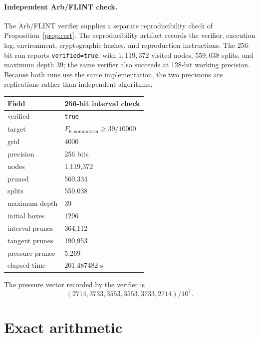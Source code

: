 \documentclass[11pt]{article}
\begin{document}
\paragraph{Independent Arb/FLINT check.}
The Arb/FLINT verifier supplies a separate reproducibility check of
Proposition~\ref{prop:cert}.  The reproducibility artifact
\cite{Hurtado26Artifact} records the verifier, execution log, environment,
cryptographic hashes, and reproduction instructions.  The 256-bit run reports
\texttt{verified=true}, with $1{,}119{,}372$ visited nodes, $559{,}038$
splits, and maximum depth $39$; the same verifier also succeeds at 128-bit
working precision.  Because both runs use the same implementation, the two
precisions are replications rather than independent algorithms.

\begin{center}
\begin{tabular}{@{}ll@{}}
\toprule
Field & 256-bit interval check\\
\midrule
verified & \texttt{true}\\
target & $F_{6,\mathrm{nonuniform}}\ge39/10000$\\
grid & 4000\\
precision & 256 bits\\
nodes & 1,119,372\\
pruned & 560,334\\
splits & 559,038\\
maximum depth & 39\\
initial boxes & 1296\\
interval prunes & 364,112\\
tangent prunes & 190,953\\
pressure prunes & 5,269\\
elapsed time & 201.487482 s\\
\bottomrule
\end{tabular}
\end{center}

The pressure vector recorded by the verifier is
\[
 (2714,3733,3553,3553,3733,2714)/10^7.
\]

\section{Exact arithmetic}
\end{document}
